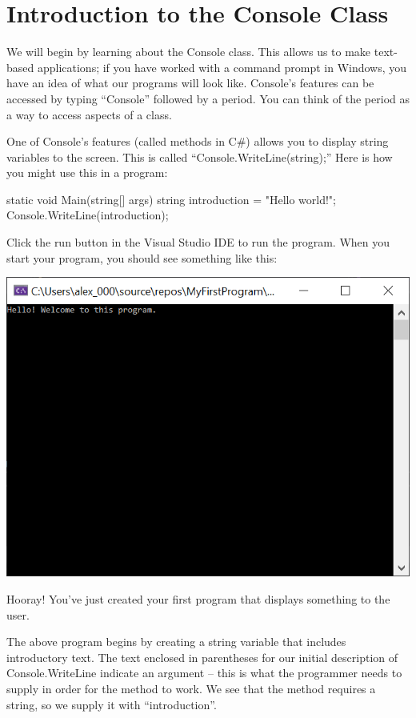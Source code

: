 \documentclass[oneside, openany] {book}
\begin{document}
\section{Introduction to the Console Class}
We will begin by learning about the
Console class. This allows us to make text-based applications; if you have worked with a command prompt in Windows, you have an idea of what our programs will look like. Console’s features can be accessed by typing “Console” followed by a period. You can think of the period as a way to access aspects of a class.

One of Console’s features (called methods in C\#) allows you to display string variables to the screen. This is called “Console.WriteLine(string);” Here is how you might use this in a program:
\begin{CSharp}
static void Main(string[] args)
{
    string introduction = "Hello world!";
    Console.WriteLine(introduction);        
}
\end{CSharp}

Click the run button in the Visual Studio IDE to run the program. 
When you start your program, you should see something like this:

\includegraphics[scale = 0.5]{BasicHelloWorld}

Hooray! You’ve just created your first program that displays something to the user.

The above program begins by creating a string variable that includes introductory text. The text enclosed in parentheses for our initial description of Console.WriteLine indicate an argument – this is what the programmer needs to supply in order for the method to work. We see that the method requires a string, so we supply it with “introduction”.
\end{document}
